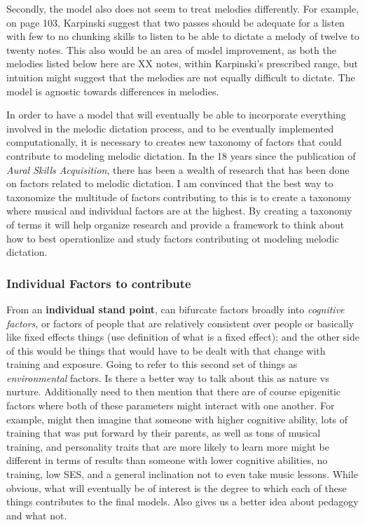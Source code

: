 \documentclass[]{book}
\theoremstyle{definition}
\theoremstyle{definition}
\theoremstyle{definition}
\theoremstyle{remark}
\begin{document}
Secondly, the model also does not seem to treat melodies differently.
For example, on page 103, Karpinski suggest that two passes should be
adequate for a listen with few to no chunking skills to listen to be
able to dictate a melody of twelve to twenty notes. This also would be
an area of model improvement, as both the melodies listed below here are
XX notes, within Karpinski's prescribed range, but intuition might
suggest that the melodies are not equally difficult to dictate. The
model is agnostic towards differences in melodies.

In order to have a model that will eventually be able to incorporate
everything involved in the melodic dictation process, and to be
eventually implemented computationally, it is necessary to creates new
taxonomy of factors that could contribute to modeling melodic dictation.
In the 18 years since the publication of \emph{Aural Skills
Acquisition}, there has been a wealth of research that has been done on
factors related to melodic dictation. I am convinced that the best way
to taxonomize the multitude of factors contributing to this is to create
a taxonomy where musical and individual factors are at the highest. By
creating a taxonomy of terms it will help organize research and provide
a framework to think about how to best operationlize and study factors
contributing ot modeling melodic dictation.

\hypertarget{individual-factors-to-contribute}{%
\subsubsection{Individual Factors to
contribute}\label{individual-factors-to-contribute}}

From an \textbf{individual stand point}, can bifurcate factors broadly
into \emph{cognitive factors}, or factors of people that are relatively
consistent over people or basically like fixed effects things (use
definition of what is a fixed effect); and the other side of this would
be things that would have to be dealt with that change with training and
exposure. Going to refer to this second set of things as
\emph{environmental} factors. Is there a better way to talk about this
as nature vs nurture. Additionally need to then mention that there are
of course epigenitic factors where both of these parameters might
interact with one another. For example, might then imagine that someone
with higher cognitive ability, lots of training that was put forward by
their parents, as well as tons of musical training, and personality
traits that are more likely to learn more
\citep{mullensiefenInvestigatingImportanceSelftheories2015} might be
different in terms of results than someone with lower cognitive
abilities, no training, low SES, and a general inclination not to even
take music lessons. While obvious, what will eventually be of interest
is the degree to which each of these things contributes to the final
models. Also gives us a better idea about pedagogy and what not.
\end{document}
